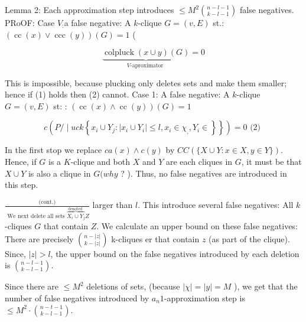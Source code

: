 Lemma 2: Each approximation step introduces $\leqslant M^2\binom{n-l-1}{k-l-1}$ false negatives.
PRoOF:
Case $V_{:}$a false negative:
A $k$-clique $G=(v, E)$ st.: $(\operatorname{cc}(x) \vee \operatorname{ccc}(y))(G)=1$ (

$$
\underbrace{\operatorname{colpluck}(x \cup y)(G)}_{V \text {-aproximator }}=0
$$


This is impossible, because plucking only deletes sets and make them smaller; hence if (1) holds then (2) cannot.
Case 1:
A false negative:
A $k$-clique $G=(v, E)$ st: : $(\operatorname{cc}(x) \wedge \operatorname{cc}(y))(G)=1$

$$
\left.c\left(P / \mid u c k\left\{x_i \cup Y_j:\left|x_i \cup Y_i\right| \leq l, x_i \in \chi_{,}, Y_i \in\right\}\right\}\right)=0 \text { (2) }
$$


In the first stop we replace $c a(x) \wedge c(y)$ by $C C(\{X \cup Y: x \in X, y \in Y\})$.
Hence, if $G$ is a $K$-clique and both $X$ and $Y$ are each cliques in $G$, it must be that $X \cup Y$ is also a clique in $G(w h y$ ? ). Thus, no false negatives are introduced in this step.


$\frac{\text { (cont.) }}{\text { We next delete all sets } \overbrace{X_i \cup Y_j}^{\text {denoted }} Z}$ larger than $l$. This introduce several false negatives:
All $k$-cliques $G$ that contain $Z$.
We calculate an upper bound on these false negatives: There are precisely $\binom{n-|z|}{k-|z|}$ k-cliques er that contain $z$ (as part of the clique). Since, $|z|>l$, the upper bound on the false negatives introduced by each deletion is $\binom{n-l-1}{k-l-1}$.

Since there are $\leqslant M^2$ deletions of sets, (because $|\chi|=|y|=M$ ), we get that the number of false negatives introduced by $a_n 1$-approximation step is $\leqslant M^2 \cdot\binom{n-t-1}{k-l-1}$.
